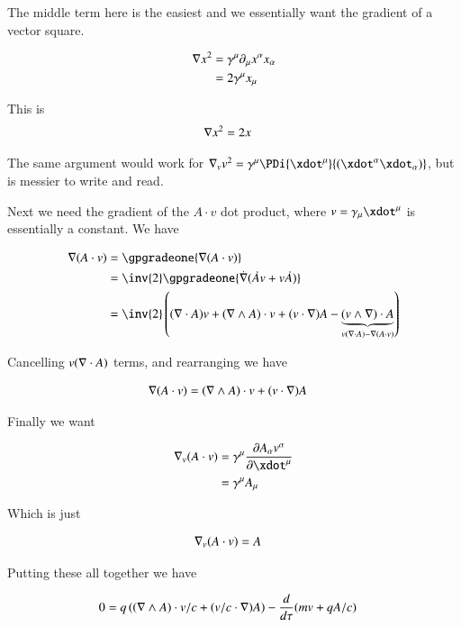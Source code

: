 \documentclass{article}
\begin{document}
The middle term here is the easiest and we essentially want the gradient of a vector square.

\begin{align*}
\nabla x^2
&=
\gamma^\mu \partial_\mu x^\alpha x_\alpha \\
&=
2 \gamma^\mu x_\mu \\
\end{align*}

This is
\begin{align}
\nabla x^2 &= 2 x
\end{align}

The same argument would work for $\grad_v v^2 = \gamma^\mu \PDi{\xdot^\mu}{(\xdot^\alpha \xdot_\alpha)}$, but is messier to write and read.

Next we need the gradient of the $A \cdot v$ dot product, where $v = \gamma_\mu \xdot^\mu$ is essentially a constant.
We have

\begin{align*}
\grad (A \cdot v)
&= \gpgradeone{ \grad (A \cdot v) } \\
&= \inv{2} \gpgradeone{ \dot{\grad} (\dot{A} v + v \dot{A}) } \\
&= \inv{2} \left( (\grad \cdot A) v + (\grad \wedge A) \cdot v + (v \cdot \grad) A - \underbrace{(v \wedge \grad) \cdot A}_{ v (\grad \cdot A) - \grad (A \cdot v)}
\right) \\
\end{align*}

Cancelling $v(\nabla \cdot A)$ terms, and rearranging we have

\begin{align}
\nabla (A \cdot v)
&= (\nabla \wedge A) \cdot v + (v \cdot \nabla) A 
\end{align}

Finally we want

\begin{align*}
\grad_v (A \cdot v)
&=
\gamma^\mu \PD{\xdot^\mu}{ A_\alpha v^\alpha} \\
&=
\gamma^\mu A_\mu \\
\end{align*}

Which is just

\begin{align}
\nabla_v (A \cdot v) &= A
\end{align}

Putting these all together we have

\begin{align*}
0 &= 
q \left( (\nabla \wedge A) \cdot v/c + (v/c \cdot \nabla) A \right)
- \frac{d}{d\tau} ( m v + q A/c)
\end{align*}
\end{document}
